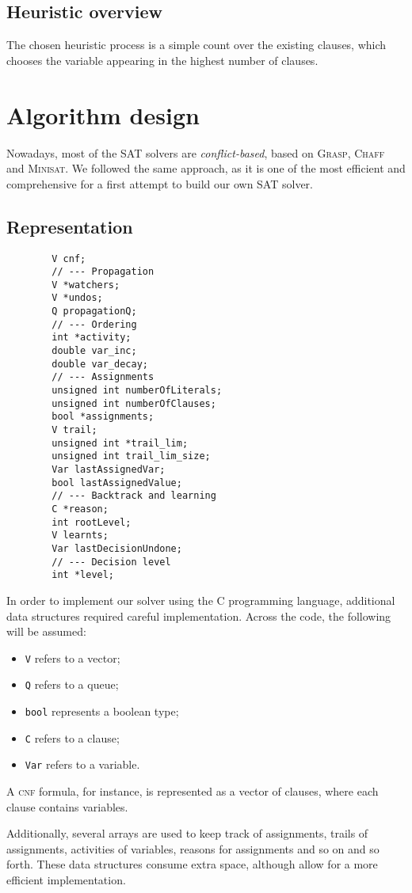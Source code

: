 \subsection{Heuristic overview}
The chosen heuristic process is a simple count over the existing clauses, which chooses the variable appearing in the highest number of clauses.
    
\newpage
    
\section{Algorithm design}
Nowadays, most of the SAT solvers are \textit{conflict-based}, based on \textsc{Grasp}, \textsc{Chaff} and \textsc{Minisat}. We followed the same approach, as it is one of the most efficient and comprehensive for a first attempt to build our own SAT solver.
    
\subsection{Representation}
\begin{multicols}{2}
    \begin{lstlisting}
        V cnf;
        // --- Propagation
        V *watchers;
        V *undos;
        Q propagationQ;
        // --- Ordering
        int *activity;
        double var_inc;
        double var_decay;
        // --- Assignments
        unsigned int numberOfLiterals;
        unsigned int numberOfClauses;
        bool *assignments;
        V trail;
        unsigned int *trail_lim;
        unsigned int trail_lim_size;
        Var lastAssignedVar;
        bool lastAssignedValue;
        // --- Backtrack and learning
        C *reason;
        int rootLevel;
        V learnts;
        Var lastDecisionUndone;
        // --- Decision level
        int *level;
	\end{lstlisting}
\columnbreak
In order to implement our solver using the C programming language, additional data structures required careful implementation. Across the code, the following will be assumed:
\begin{itemize}
	\item \texttt{V} refers to a vector;
    \item \texttt{Q} refers to a queue;
    \item \texttt{bool} represents a boolean type;
    \item \texttt{C} refers to a clause;
    \item \texttt{Var} refers to a variable.
\end{itemize}
A \textsc{cnf} formula, for instance, is represented as a vector of clauses, where each clause contains variables.

Additionally, several arrays are used to keep track of assignments, trails of assignments, activities of variables, reasons for assignments and so on and so forth. These data structures consume extra space, although allow for a more efficient implementation.
\end{multicols}
    

